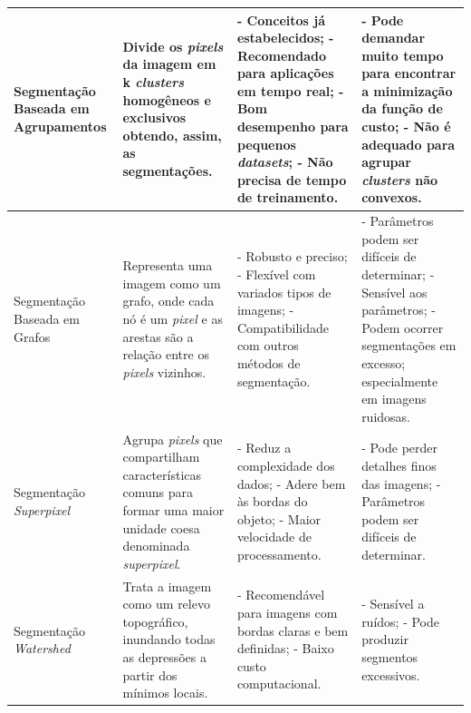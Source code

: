\begin{landscape}
\begin{table}[p]
{\begin{tabularx}{\linewidth}{l|X|X|X}
        Segmentação Baseada em Agrupamentos & Divide os \textit{pixels} da imagem em k \textit{clusters} homogêneos e exclusivos obtendo, assim, as segmentações.                                                  & - Conceitos já estabelecidos; \newline - Recomendado para aplicações em tempo real; \newline - Bom desempenho para pequenos \textit{datasets}; \newline - Não precisa de tempo de treinamento.                          & - Pode demandar muito tempo para encontrar a minimização da função de custo; \newline - Não é adequado para agrupar \textit{clusters} não convexos.                                                  \\ 
        \hline
        Segmentação Baseada em Grafos       & Representa uma imagem como um grafo, onde cada nó é um \textit{pixel} e as arestas são a relação entre os \textit{pixels} vizinhos.                                 & - Robusto e preciso; \newline - Flexível com variados tipos de imagens; \newline - Compatibilidade com outros métodos de segmentação.                                                                             & - Parâmetros podem ser difíceis de determinar; \newline - Sensível aos parâmetros; \newline - Podem ocorrer segmentações em excesso; especialmente em imagens ruidosas.                               \\
        \hline
        Segmentação  \textit{Superpixel}    & Agrupa \textit{pixels} que compartilham características comuns para formar uma maior unidade coesa denominada \textit{superpixel}.                                  & - Reduz a complexidade dos dados; \newline - Adere bem às bordas do objeto; \newline - Maior velocidade de processamento.                                                                                                 & - Pode perder detalhes finos das imagens; \newline - Parâmetros podem ser difíceis de determinar.                                                                                                    \\
        \hline
        Segmentação \textit{Watershed}      & Trata a imagem como um relevo topográfico, inundando todas as depressões a partir dos mínimos locais.                                                              & - Recomendável para imagens com bordas claras e bem definidas; \newline - Baixo custo computacional.                                                                                                                     & - Sensível a ruídos; \newline - Pode produzir segmentos excessivos.                                                                                                                                   \\

\end{tabularx}}
\end{table}
\end{landscape}
